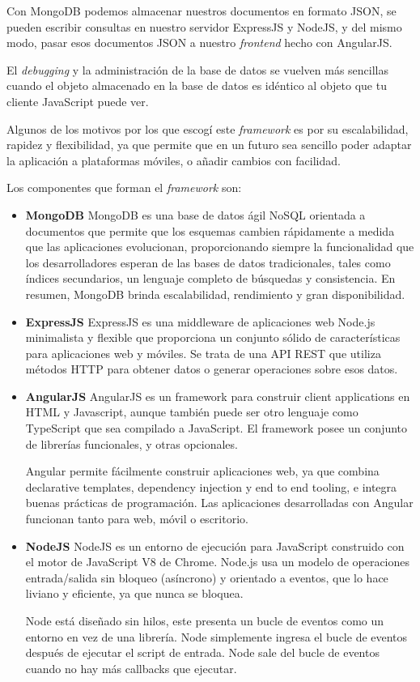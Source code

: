 Con MongoDB podemos almacenar nuestros documentos en formato JSON, se pueden escribir consultas en nuestro servidor ExpressJS y NodeJS, y del mismo modo, pasar esos documentos JSON a nuestro \textit{frontend} hecho con AngularJS.


El \textit{debugging} y la administración de la base de datos se vuelven más sencillas cuando el objeto almacenado en la base de datos es idéntico al objeto que tu cliente JavaScript puede ver\cite{mongodb_mean_stack}.


Algunos de los motivos por los que escogí este \textit{framework} es por su escalabilidad, rapidez y flexibilidad, ya que permite que en un futuro sea sencillo poder adaptar la aplicación a plataformas móviles, o añadir cambios con facilidad.


Los componentes que forman el \textit{framework} son:


\begin{itemize}
\item \textbf{MongoDB}
MongoDB es una base de datos ágil NoSQL orientada a documentos que permite que los esquemas cambien rápidamente a medida que las aplicaciones evolucionan, proporcionando siempre la funcionalidad que los desarrolladores esperan de las bases de datos tradicionales, tales como índices secundarios, un lenguaje completo de búsquedas y consistencia. En resumen, MongoDB brinda escalabilidad, rendimiento y gran disponibilidad\cite{mongodb_gest_datos}. 
\item \textbf{ExpressJS}
ExpressJS es una middleware de aplicaciones web Node.js minimalista y flexible que proporciona un conjunto sólido de características para aplicaciones web y móviles\cite{express}. Se trata de una API REST que utiliza métodos HTTP para obtener datos o generar operaciones sobre esos datos.
\item \textbf{AngularJS}
AngularJS es un framework para construir client applications en HTML y Javascript, aunque también puede ser otro lenguaje como TypeScript que sea compilado a JavaScript. El framework posee un conjunto de librerías funcionales, y otras opcionales\cite{angular_docs}.


Angular permite fácilmente construir aplicaciones web, ya que combina declarative templates, dependency injection y end to end tooling, e integra buenas prácticas de programación. Las aplicaciones desarrolladas con Angular funcionan tanto para web, móvil o escritorio\cite{angular_arch}. 
\item \textbf{NodeJS}
NodeJS es un entorno de ejecución para JavaScript construido con el motor de JavaScript V8 de Chrome. Node.js usa un modelo de operaciones entrada/salida sin bloqueo (asíncrono) y orientado a eventos, que lo hace liviano y eficiente, ya que nunca se bloquea. 


Node está diseñado sin hilos, este presenta un bucle de eventos como un entorno en vez de una librería. Node simplemente ingresa el bucle de eventos después de ejecutar el script de entrada. Node sale del bucle de eventos cuando no hay más callbacks que ejecutar\cite{node_acerca}.
\end{itemize}


